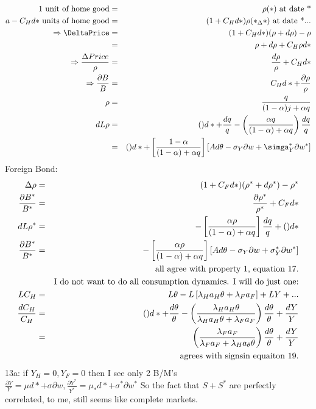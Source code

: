 \documentclass[]{article}
\begin{document}
\begin{eqnarray}
\mbox{1 unit of home good} &=& \rho (*) \mbox{ at date *}\notag\\
\mbox{$a-C_Hd*$ units of home good} &=& (1+C_Hd*)\rho (*_\Delta *) \mbox{ at date *...}\notag\\
\Rightarrow \DeltaPrice &=& (1+C_Hd*)(\rho+d\rho)-\rho\notag\\
&=& \rho +d\rho + C_H\rho d*\notag\\
\Rightarrow \frac{\Delta Price}{\rho} &=& \frac{d\rho}{\rho} + C_Hd*\notag\\
\Rightarrow \frac{\partial B}{B} &=& C_Hd* + \frac{\partial \rho}{\rho}\notag\\
\rho &=& \frac{q}{(1-\alpha)j + \alpha q}\notag\\
dL\rho &=& () d* + \frac{dq}{q} - \left(\frac{\alpha q}{(1-\alpha)+\alpha q}\right)\frac{dq}{q}\notag\\
&=& ()d* + \left[\frac{1-\alpha}{(1-\alpha)+\alpha q}\right] \left[Ad\theta - \sigma_Y \partial w + \simga^*_Y \partial w^*\right]
\end{eqnarray} 
Foreign Bond:
\begin{eqnarray}
\Delta \rho &=& (1+C_Fd*)(\rho^* + d\rho^*) - \rho^*\notag\\
\frac{\partial B^*}{B^*} &=& \frac{\partial \rho^*}{\rho^*} + C_Fd*\notag\\
dL\rho^* &=& -\left[\frac{\alpha \rho}{(1-\alpha)+\alpha q}\right] \frac{dq}{q} + ()d*\notag\\
\frac{\partial B^*}{B^*} &=& -\left[\frac{\alpha \rho}{(1-\alpha)+\alpha q}\right] \left[Ad\theta - \sigma _Y \partial w + \sigma_Y^* \partial w^*\right]\\
&&\mbox{all agree with property 1, equation 17.}\notag\\
&&\mbox{I do not want to do all consumption dynamics. I will do just one:}\notag\\
LC_H &=& L\theta - L\left[\lambda_H a_H \theta + \lambda_F a_F\right] + LY + ...\notag\\
\frac{dC_H}{C_H} &=& ()d* + \frac{d\theta}{\theta} - \left(\frac{\lambda_H a_H\theta}{\lambda_H a_H\theta+\lambda_F a_F}\right)\frac{d\theta}{\theta} + \frac{dY}{Y}\notag\\
&=& \left(\frac{\lambda_F a_F}{\lambda_F a_F+\lambda_H a_\theta \theta}\right) \frac{d\theta}{\theta} + \frac{dY}{Y}\\
&&\mbox{agrees with signsin equaiton 19.}\notag
\end{eqnarray}
13a: if $Y_H=0, Y_F=0$ then I see only 2 B/M's $\frac{\partial Y}{Y}=\mu d* + \sigma \partial w, \frac{\partial Y^*}{Y^*} = \mu_*d*+\sigma^* \partial w^*$ So the fact that $S+S^*$ are perfectly correlated, to me, still seems like complete markets.
\end{document}
